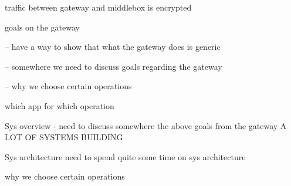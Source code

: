 traffic between gateway and middlebox is encrypted

goals on the gateway

-- have a way to show that what the gateway does is generic 
   
-- somewhere we need to discuss goals regarding the gateway

-- why we choose certain operations

which app for which operation

Sys overview
- need to discuss somewhere the above goals from the gateway
A LOT OF SYSTEMS BUILDING

Sys architecture
need to spend quite some time on sys architecture

why we choose certain operations

